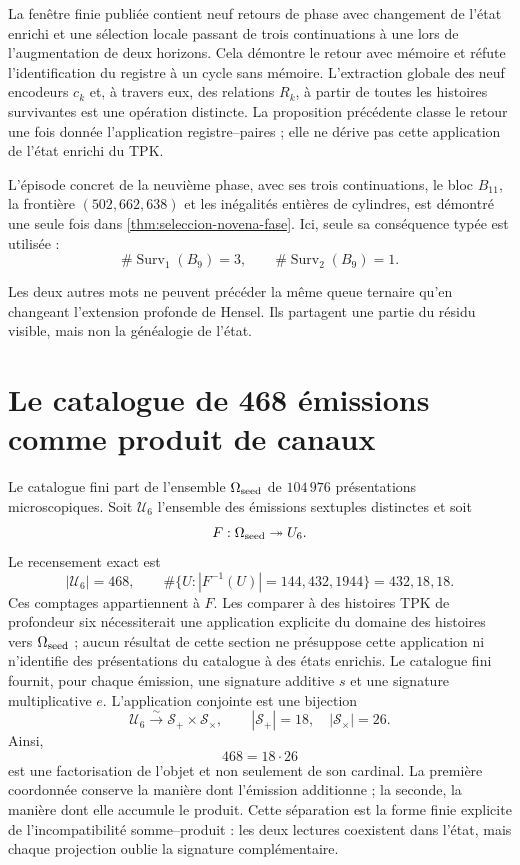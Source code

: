 La fenêtre finie publiée contient neuf retours de phase avec changement de
l'état enrichi et une sélection locale passant de trois continuations à une lors de
l'augmentation de deux horizons. Cela démontre le retour avec mémoire et réfute
l'identification du registre à un cycle sans mémoire. L'extraction globale des
neuf encodeurs \(c_k\) et, à travers eux, des relations
\(R_k\), à partir de toutes les histoires survivantes est une opération distincte.
La proposition précédente classe le retour une fois donnée l'application
registre--paires ; elle ne dérive pas cette application de l'état enrichi du TPK.

L'épisode concret de la neuvième phase, avec ses trois continuations, le
bloc \(B_{11}\), la frontière \((502,662,638)\) et les inégalités entières
de cylindres, est démontré une seule fois dans
\cref{thm:seleccion-novena-fase}. Ici, seule sa
conséquence typée est utilisée :
\[
\#\operatorname{Surv}_{1}(B_9)=3,\qquad
\#\operatorname{Surv}_{2}(B_9)=1.
\]

Les deux autres mots ne peuvent précéder la même queue ternaire qu'en changeant
l'extension profonde de Hensel. Ils partagent une partie du résidu visible,
mais non la généalogie de l'état.

\section{Le catalogue de 468 émissions comme produit de canaux}

Le catalogue fini part de l'ensemble
\(\Omega_{\rm seed}\) de \(104\,976\) présentations microscopiques. Soit
\(\mathcal U_6\) l'ensemble des émissions sextuples distinctes et soit
\[
 F:\Omega_{\rm seed}\twoheadrightarrow\mathcal U_6.
\]
Le recensement exact est
\[
 |\mathcal U_6|=468,
 \qquad
 \#\{U:|F^{-1}(U)|=144,432,1944\}=432,18,18.
\]
Ces comptages appartiennent à \(F\). Les comparer à des histoires TPK de
profondeur six nécessiterait une application explicite du domaine des histoires
vers \(\Omega_{\rm seed}\) ; aucun résultat de cette section ne présuppose cette
application ni n'identifie des présentations du catalogue à des états enrichis.
Le catalogue fini fournit, pour chaque émission, une signature additive
\(s\) et une signature multiplicative \(e\). L'application conjointe est une
bijection
\[
 \mathcal U_6\xrightarrow{\sim}
 \mathcal S_+\times\mathcal S_\times,
 \qquad
 |\mathcal S_+|=18,
 \quad
 |\mathcal S_\times|=26.
\]
Ainsi,
\[
 \boxed{468=18\cdot26}
\]
est une factorisation de l'objet et non seulement de son cardinal. La première
coordonnée conserve la manière dont l'émission additionne ; la seconde, la manière dont elle accumule le
produit. Cette séparation est la forme finie explicite de
l'incompatibilité somme--produit : les deux lectures coexistent dans l'état, mais
chaque projection oublie la signature complémentaire.

